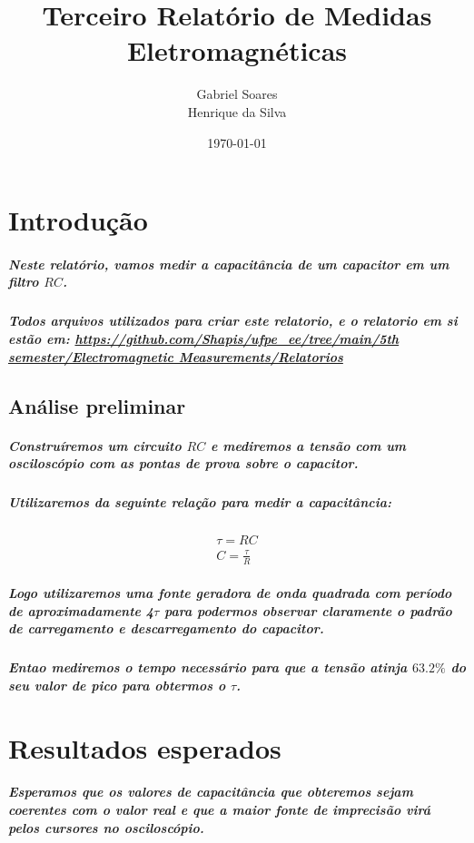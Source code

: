 \documentclass[12pt,twoside, a4paper, twocolumn]{article}
\title{Terceiro Relatório de Medidas Eletromagnéticas}
\author{Gabriel Soares \\ Henrique da Silva}
\date{\today}
\begin{document}
\maketitle
{}
\newpage
\tableofcontents
\newpage



\section{Introdução}


\subparagraph*{Neste relatório, vamos medir a capacitância de um capacitor em um filtro $RC$.}

\subparagraph*{Todos arquivos utilizados para criar este relatorio, e o relatorio em si estão em:  \url{https://github.com/Shapis/ufpe_ee/tree/main/5th semester/Electromagnetic Measurements/Relatorios}}




\subsection{Análise preliminar}

\subparagraph*{Construíremos um circuito $RC$ e mediremos a tensão com um osciloscópio com as pontas de prova sobre o capacitor.}

\subparagraph*{Utilizaremos da seguinte relação para medir a capacitância:}

\begin{equation}
    \begin{aligned}
        \tau = RC \\
        C = \frac{\tau}{R}
    \end{aligned}
\end{equation}

\subparagraph*{Logo utilizaremos uma fonte geradora de onda quadrada com período de aproximadamente 4$\tau$ para podermos observar claramente o padrão de carregamento e descarregamento do capacitor.}

\subparagraph*{Entao mediremos o tempo necessário para que a tensão atinja $63.2\%$ do seu valor de pico para obtermos o $\tau$.}

\section{Resultados esperados}

\subparagraph*{Esperamos que os valores de capacitância que obteremos sejam coerentes com o valor real e que a maior fonte de imprecisão virá pelos cursores no osciloscópio.}
\end{document}
